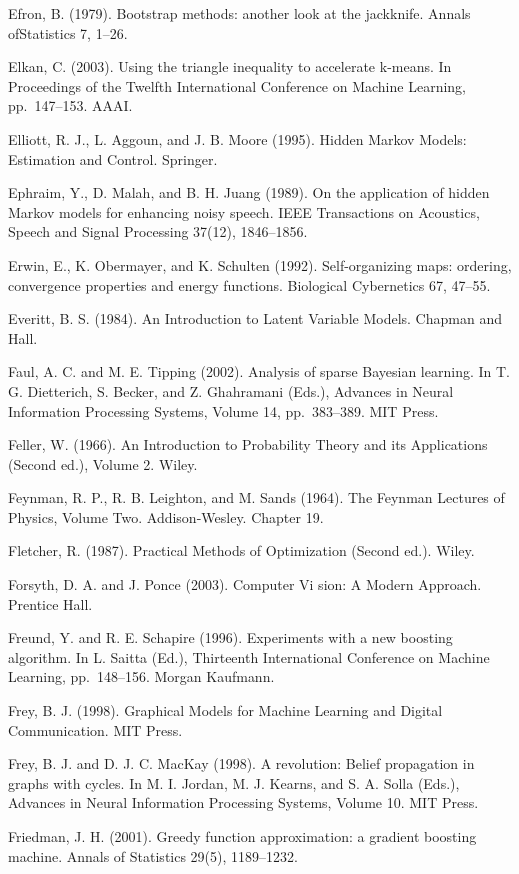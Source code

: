 \documentclass[
  10
]{article}
\begin{document}
Efron, B. (1979). Bootstrap methods: another look at the jackknife.
Annals ofStatistics 7, 1--26.

Elkan, C. (2003). Using the triangle inequality to accelerate k-means.
In Proceedings of the Twelfth International Conference on Machine
Learning, pp.~147--153. AAAI.

Elliott, R. J., L. Aggoun, and J. B. Moore (1995). Hidden Markov Models:
Estimation and Control. Springer.

Ephraim, Y., D. Malah, and B. H. Juang (1989). On the application of
hidden Markov models for enhancing noisy speech. IEEE Transactions on
Acoustics, Speech and Signal Processing 37(12), 1846--1856.

Erwin, E., K. Obermayer, and K. Schulten (1992). Self-organizing maps:
ordering, convergence properties and energy functions. Biological
Cybernetics 67, 47--55.

Everitt, B. S. (1984). An Introduction to Latent Variable Models.
Chapman and Hall.

Faul, A. C. and M. E. Tipping (2002). Analysis of sparse Bayesian
learning. In T. G. Dietterich, S. Becker, and Z. Ghahramani (Eds.),
Advances in Neural Information Processing Systems, Volume 14,
pp.~383--389. MIT Press.

Feller, W. (1966). An Introduction to Probability Theory and its
Applications (Second ed.), Volume 2. Wiley.

Feynman, R. P., R. B. Leighton, and M. Sands (1964). The Feynman
Lectures of Physics, Volume Two. Addison-Wesley. Chapter 19.

Fletcher, R. (1987). Practical Methods of Optimization (Second ed.).
Wiley.

Forsyth, D. A. and J. Ponce (2003). Computer Vi sion: A Modern Approach.
Prentice Hall.

Freund, Y. and R. E. Schapire (1996). Experiments with a new boosting
algorithm. In L. Saitta (Ed.), Thirteenth International Conference on
Machine Learning, pp.~148--156. Morgan Kaufmann.

Frey, B. J. (1998). Graphical Models for Machine Learning and Digital
Communication. MIT Press.

Frey, B. J. and D. J. C. MacKay (1998). A revolution: Belief propagation
in graphs with cycles. In M. I. Jordan, M. J. Kearns, and S. A. Solla
(Eds.), Advances in Neural Information Processing Systems, Volume 10.
MIT Press.

Friedman, J. H. (2001). Greedy function approximation: a gradient
boosting machine. Annals of Statistics 29(5), 1189--1232.
\end{document}
